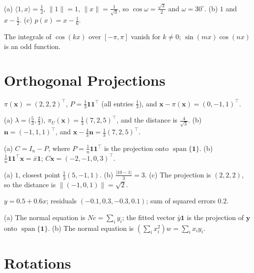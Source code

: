 \documentclass[11pt]{article}
\newcommand{\norm}[1]{\lVert #1 \rVert}
\newcommand{\ip}[2]{\langle #1, #2 \rangle}
\DeclareMathOperator{\Span}{span}
\begin{document}
\begin{description}[leftmargin=0pt, itemsep=0.3em]
    \item[\ref{pr:func-ip}.] (a) $\ip{1}{x} = \frac{1}{2}$, $\norm{1} = 1$, $\norm{x} = \frac{1}{\sqrt{3}}$, so $\cos\omega = \frac{\sqrt{3}}{2}$ and $\omega = 30^\circ$. (b) $1$ and $x - \frac{1}{2}$. (c) $p(x) = x - \frac{1}{6}$.
    \item[\ref{pr:fourier}.] The integrals of $\cos(kx)$ over $[-\pi, \pi]$ vanish for $k \neq 0$; $\sin(mx)\cos(nx)$ is an odd function.
\end{description}

\section*{Orthogonal Projections}

\begin{description}[leftmargin=0pt, itemsep=0.3em]
    \item[\ref{pr:proj-line}.] $\pi(\mathbf{x}) = (2, 2, 2)^\top$, $P = \frac{1}{3}\mathbf{1}\mathbf{1}^\top$ (all entries $\frac{1}{3}$), and $\mathbf{x} - \pi(\mathbf{x}) = (0, -1, 1)^\top$.
    \item[\ref{pr:proj-plane}.] (a) $\lambda = \big(\frac{5}{3}, \frac{2}{3}\big)$, $\pi_U(\mathbf{x}) = \frac{1}{3}(7, 2, 5)^\top$, and the distance is $\frac{4}{\sqrt{3}}$. (b) $\mathbf{n} = (-1, 1, 1)^\top$, and $\mathbf{x} - \frac{4}{3} \mathbf{n} = \frac{1}{3}(7, 2, 5)^\top$.
    \item[\ref{pr:centering}.] (a) $C = I_n - P$, where $P = \frac{1}{n}\mathbf{1}\mathbf{1}^\top$ is the projection onto $\Span\{\mathbf{1}\}$. (b) $\frac{1}{n}\mathbf{1}\mathbf{1}^\top \mathbf{x} = \bar{x}\mathbf{1}$; $C\mathbf{x} = (-2, -1, 0, 3)^\top$.
    \item[\ref{pr:distances}.] (a) $1$, closest point $\frac{1}{3}(5, -1, 1)$. (b) $\frac{|10 - 1|}{3} = 3$. (c) The projection is $(2, 2, 2)$, so the distance is $\norm{(-1, 0, 1)} = \sqrt{2}$.
    \item[\ref{pr:least-squares}.] $y = 0.5 + 0.6x$; residuals $(-0.1, 0.3, -0.3, 0.1)$; sum of squared errors $0.2$.
    \item[\ref{pr:ls-special}.] (a) The normal equation is $N c = \sum_i y_i$; the fitted vector $\bar{y}\mathbf{1}$ is the projection of $\mathbf{y}$ onto $\Span\{\mathbf{1}\}$. (b) The normal equation is $(\sum_i x_i^2) w = \sum_i x_i y_i$.
\end{description}

\section*{Rotations}
\end{document}
